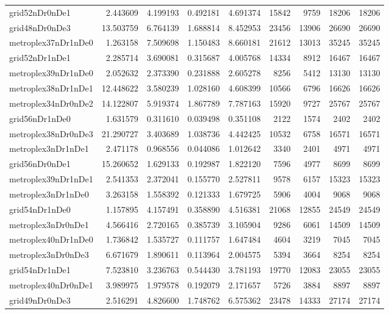 \begin{longtable}{|l|r|r|r|r|r|r|r|r|}
grid52nDr0nDe1 & 2.443609 & 4.199193 & 0.492181 & 4.691374 & 15842 & 9759 & 18206 & 18206 \\
grid48nDr0nDe3 & 13.503759 & 6.764139 & 1.688814 & 8.452953 & 23456 & 13906 & 26690 & 26690 \\
metroplex37nDr1nDe0 & 1.263158 & 7.509698 & 1.150483 & 8.660181 & 21612 & 13013 & 35245 & 35245 \\
grid52nDr1nDe1 & 2.285714 & 3.690081 & 0.315687 & 4.005768 & 14334 & 8912 & 16467 & 16467 \\
metroplex39nDr1nDe0 & 2.052632 & 2.373390 & 0.231888 & 2.605278 & 8256 & 5412 & 13130 & 13130 \\
metroplex38nDr1nDe1 & 12.448622 & 3.580239 & 1.028160 & 4.608399 & 10566 & 6796 & 16626 & 16626 \\
metroplex34nDr0nDe2 & 14.122807 & 5.919374 & 1.867789 & 7.787163 & 15920 & 9727 & 25767 & 25767 \\
grid56nDr1nDe0 & 1.631579 & 0.311610 & 0.039498 & 0.351108 & 2122 & 1574 & 2402 & 2402 \\
metroplex38nDr0nDe3 & 21.290727 & 3.403689 & 1.038736 & 4.442425 & 10532 & 6758 & 16571 & 16571 \\
metroplex3nDr1nDe1 & 2.471178 & 0.968556 & 0.044086 & 1.012642 & 3340 & 2401 & 4971 & 4971 \\
grid56nDr0nDe1 & 15.260652 & 1.629133 & 0.192987 & 1.822120 & 7596 & 4977 & 8699 & 8699 \\
metroplex39nDr1nDe1 & 2.541353 & 2.372041 & 0.155770 & 2.527811 & 9578 & 6157 & 15323 & 15323 \\
metroplex3nDr1nDe0 & 3.263158 & 1.558392 & 0.121333 & 1.679725 & 5906 & 4004 & 9068 & 9068 \\
grid54nDr1nDe0 & 1.157895 & 4.157491 & 0.358890 & 4.516381 & 21068 & 12855 & 24549 & 24549 \\
metroplex3nDr0nDe1 & 4.566416 & 2.720165 & 0.385739 & 3.105904 & 9286 & 6061 & 14509 & 14509 \\
metroplex40nDr1nDe0 & 1.736842 & 1.535727 & 0.111757 & 1.647484 & 4604 & 3219 & 7045 & 7045 \\
metroplex3nDr0nDe3 & 6.671679 & 1.890611 & 0.113964 & 2.004575 & 5394 & 3664 & 8254 & 8254 \\
grid54nDr1nDe1 & 7.523810 & 3.236763 & 0.544430 & 3.781193 & 19770 & 12083 & 23055 & 23055 \\
metroplex40nDr0nDe1 & 3.989975 & 1.979578 & 0.192079 & 2.171657 & 5726 & 3884 & 8897 & 8897 \\
grid49nDr0nDe3 & 2.516291 & 4.826600 & 1.748762 & 6.575362 & 23478 & 14333 & 27174 & 27174 \\

\end{longtable}

